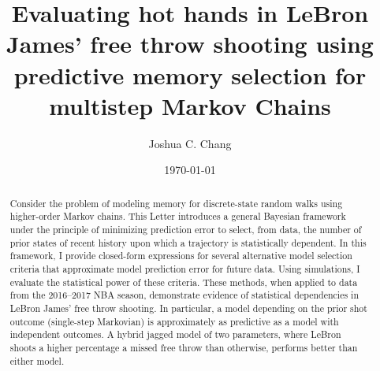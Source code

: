 \documentclass[prl,twocolumn,groupedaddress]{revtex4-1}
\begin{document}
\title[Memory determination in finite-state random walks]{Evaluating hot hands in LeBron James' free throw shooting using predictive memory selection for multistep Markov Chains}
\author{Joshua C. Chang}
\date{\today}                       

\begin{abstract}
Consider the problem of modeling memory for discrete-state random walks using higher-order Markov chains.  This Letter introduces a general Bayesian framework under the principle of minimizing prediction error to select, from data, the number of prior states of recent history upon which a trajectory is statistically dependent. In this framework, I provide closed-form expressions for several alternative model selection criteria that approximate model prediction error for future data. Using simulations, I evaluate the statistical power of these criteria. These methods, when applied to data from the 2016--2017 NBA season, demonstrate evidence of statistical dependencies in LeBron James' free throw shooting. In particular, a model depending on the prior shot outcome (single-step Markovian) is approximately as predictive as a model with independent outcomes. A hybrid jagged model of two parameters, where LeBron shoots a higher percentage a missed free throw than otherwise, performs better than either model.


\end{abstract}

\maketitle
\end{document}
